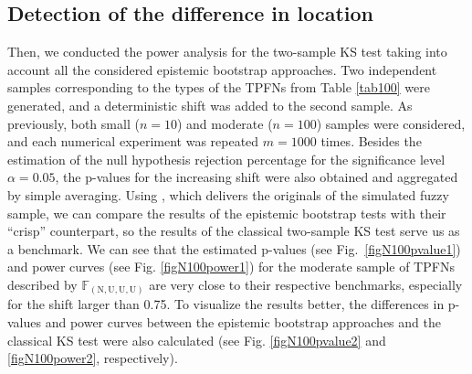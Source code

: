 \subsection{Detection of the difference in location}
Then, we conducted the power analysis for the two-sample KS test taking into account all the considered epistemic bootstrap approaches.
Two independent samples corresponding to the types of the TPFNs from Table \ref{tab100} were generated, and a deterministic shift was added to the second sample.
As previously, both small ($n=10$) and moderate ($n=100$) samples were considered, and each numerical experiment was repeated $m=1000$ times.
Besides the estimation of the null hypothesis rejection percentage for the significance level $\alpha =0.05$, the p-values for the increasing shift were also obtained and aggregated by simple averaging.
Using , which delivers the originals of the simulated fuzzy sample, we can compare the results of the epistemic bootstrap tests with their ``crisp'' counterpart, so the results of the classical two-sample KS test serve us as a benchmark.
We can see that the estimated p-values (see Fig.~\ref{figN100pvalue1}) and power curves (see Fig. \ref{figN100power1}) for the moderate sample of TPFNs described by $\mathbb{F}_{(\mathrm{N,U,U,U})}$ are very close to their respective benchmarks, especially for the shift larger than 0.75.
To visualize the results better, the differences in p-values and power curves between the epistemic bootstrap approaches and the classical KS test were also calculated (see Fig. \ref{figN100pvalue2} and \ref{figN100power2}, respectively).

